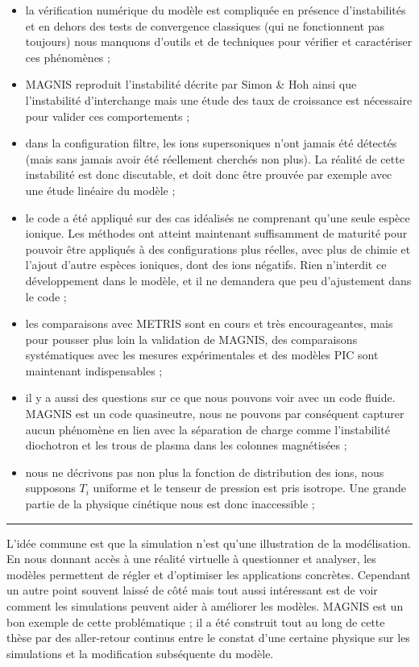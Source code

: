 \begin{itemize}

  \item la vérification numérique du modèle est compliquée en présence
  d'instabilités et en dehors des tests de convergence classiques (qui ne
  fonctionnent pas toujours) nous manquons d'outils et de techniques pour
  vérifier et caractériser ces phénomènes ;
  \item MAGNIS reproduit l'instabilité décrite par Simon \& Hoh ainsi
  que l'instabilité d'interchange mais une étude des taux de croissance est
  nécessaire pour valider ces comportements ;
  \item dans la configuration filtre, les ions supersoniques n'ont
  jamais été détectés (mais sans jamais avoir été réellement cherchés non
  plus). La réalité de cette instabilité est donc discutable, et doit
  donc être prouvée par exemple avec une étude linéaire du modèle ; 
  \item le code a été appliqué sur des cas idéalisés ne comprenant qu'une seule
  espèce ionique. Les méthodes ont atteint maintenant suffisamment
  de maturité pour pouvoir être appliqués à des configurations plus réelles,
  avec plus de chimie et l'ajout d'autre espèces ioniques, dont des ions
  négatifs. Rien n'interdit ce développement dans le modèle, et il ne demandera
  que peu d'ajustement dans le code ;
  \item les comparaisons avec METRIS sont en cours et très encourageantes,
  mais pour pousser plus loin la validation de MAGNIS, des comparaisons
  systématiques avec les mesures expérimentales et des modèles PIC sont
  maintenant indispensables ;
  \item  il y a aussi des questions sur ce que nous
  pouvons voir avec un code fluide. MAGNIS est un code quasineutre, nous ne
  pouvons par conséquent capturer aucun phénomène en lien avec la séparation
  de charge comme l'instabilité diochotron et les trous de plasma dans les
  colonnes magnétisées ;
  \item nous ne décrivons pas non plus la fonction de distribution des
  ions, nous supposons $T_i$ uniforme et le tenseur de pression est pris
  isotrope. Une grande partie de la physique cinétique nous est donc
  inaccessible ;
\end{itemize} 


\begin{center}
\rule{0.6\textwidth}{1pt}
\end{center}

L'idée commune est que la simulation n'est qu'une illustration de la
modélisation. En nous donnant accès à une réalité virtuelle à questionner et
analyser, les modèles permettent de régler et d'optimiser les applications
concrètes. Cependant un autre point souvent laissé de côté mais tout aussi
intéressant est de voir comment les simulations peuvent aider à améliorer les
modèles. MAGNIS est un bon exemple de cette problématique ; il a été construit
tout au long de cette thèse par des aller-retour continus entre le constat d'une
certaine physique sur les simulations et la modification subséquente du modèle.



